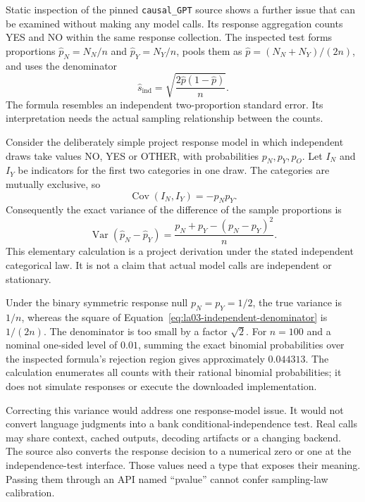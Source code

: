 Static inspection of the pinned \texttt{causal\_GPT} source shows a further
issue that can be examined without making any model calls. Its response
aggregation counts YES and NO within the same response collection. The
inspected test forms proportions $\widehat p_N=N_N/n$ and
$\widehat p_Y=N_Y/n$, pools them as
$\widehat p=(N_N+N_Y)/(2n)$, and uses the denominator
\begin{equation}
 \widehat s_{\mathrm{ind}}=
 \sqrt{\frac{2\widehat p(1-\widehat p)}{n}}.
 \label{eq:la03-independent-denominator}
\end{equation}
The formula resembles an independent two-proportion standard error. Its
interpretation needs the actual sampling relationship between the counts.

Consider the deliberately simple project response model in which independent
draws take values NO, YES or OTHER, with probabilities $p_N,p_Y,p_O$. Let
$I_N$ and $I_Y$ be indicators for the first two categories in one draw. The
categories are mutually exclusive, so
\[
 \operatorname{Cov}(I_N,I_Y)=-p_Np_Y.
\]
Consequently the exact variance of the difference of the sample proportions is
\begin{equation}
 \operatorname{Var}(\widehat p_N-\widehat p_Y)
 =\frac{p_N+p_Y-(p_N-p_Y)^2}{n}.
 \label{eq:la03-multinomial-variance}
\end{equation}
This elementary calculation is a project derivation under the stated
independent categorical law. It is not a claim that actual model calls are
independent or stationary.

Under the binary symmetric response null $p_N=p_Y=1/2$, the true variance is
$1/n$, whereas the square of
Equation~\eqref{eq:la03-independent-denominator} is $1/(2n)$. The denominator
is too small by a factor $\sqrt{2}$. For $n=100$ and a nominal one-sided
level of $0.01$, summing the exact binomial probabilities over the inspected
formula's rejection region gives approximately $0.044313$. The calculation
enumerates all counts with their rational binomial probabilities; it does not
simulate responses or execute the downloaded implementation.

Correcting this variance would address one response-model issue. It would not
convert language judgments into a bank conditional-independence test. Real
calls may share context, cached outputs, decoding artifacts or a changing
backend. The source also converts the response decision to a numerical zero
or one at the independence-test interface. Those values need a type that
exposes their meaning. Passing them through an API named ``pvalue'' cannot
confer sampling-law calibration.

